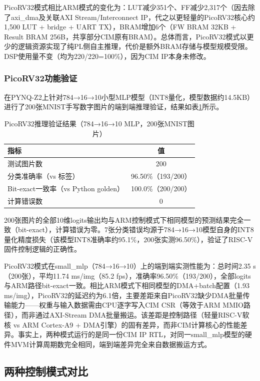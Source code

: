 \documentclass[12pt, a4paper]{article}
\begin{document}
PicoRV32模式相比ARM模式的变化为：LUT减少351个、FF减少2,317个（因去除了axi\_dma及关联AXI Stream/Interconnect IP，代之以更轻量的PicoRV32核心约1,500 LUT + bridge + UART TX），BRAM增加6个（FW BRAM 32KB + Result BRAM 256B，共享部分CIM原有BRAM）。总体而言，PicoRV32模式以更少的逻辑资源实现了纯PL侧自主推理，代价是额外BRAM存储与模型规模受限。DSP使用量不变（均为220/220=100\%），因为CIM IP本身未修改。

\subsubsection{PicoRV32功能验证}

在PYNQ-Z2上针对784→16→10小型MLP模型（INT8量化，模型数据约14.5KB）进行了200张MNIST手写数字图片的端到端推理验证，结果如表\ref{tab:rv32_verify}所示。

\begin{table}[H]
	\centering
	\caption{PicoRV32推理验证结果（784→16→10 MLP，200张MNIST图片）}
	\begin{tabular}{lc}
		\toprule
		指标 & 值 \\
		\midrule
		测试图片数 & 200 \\
		分类准确率（vs 标签） & 96.50\%（193/200） \\
		Bit-exact一致率（vs Python golden） & 100.0\%（200/200） \\
		计算错误数 & 0 \\
		\bottomrule
	\end{tabular}
	\label{tab:rv32_verify}
\end{table}

200张图片的全部10维logits输出均与ARM控制模式下相同模型的预测结果完全一致（bit-exact），计算错误为零。7张分类错误均源于784→16→10模型自身的INT8量化精度损失（该模型INT8准确率约95.1\%，200张实测96.50\%），验证了RISC-V固件控制逻辑的正确性。

PicoRV32模式在small\_mlp（784→16→10）上的端到端实测性能为：总时间2.35 s（200张），平均11.74 ms/img（85.2 fps），准确率96.50\%（193/200），全部logits与ARM路径bit-exact一致。相比ARM模式下相同模型的DMA+batch配置（1.93 ms/img），PicoRV32的延迟约为6.1倍，主要差距来自PicoRV32缺少DMA批量传输能力——权重与输入数据需由CPU逐字写入CIM CSR（等效于ARM MMIO路径），而非通过AXI-Stream DMA批量搬运。该差距是控制路径（轻量RISC-V软核 vs ARM Cortex-A9 + DMA引擎）的固有差异，而非CIM计算核心的性能差异。事实上，两种模式运行的是同一份CIM IP RTL，对同一small\_mlp模型的硬件MVM计算周期数完全相同，端到端差异完全来自数据搬运方式。

\subsection{两种控制模式对比}
\end{document}
